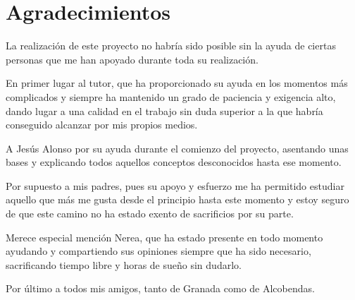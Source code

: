 \chapter*{Agradecimientos}

La realización de este proyecto no habría sido posible sin la ayuda de ciertas personas que me han apoyado durante toda su realización.

En primer lugar al tutor, que ha proporcionado su ayuda en los momentos más complicados y siempre ha mantenido un grado de paciencia y exigencia alto, dando lugar a una calidad en el trabajo sin duda superior a la que habría conseguido alcanzar por mis propios medios.

A Jesús Alonso por su ayuda durante el comienzo del proyecto, asentando unas bases y explicando todos aquellos conceptos desconocidos hasta ese momento.

Por supuesto a mis padres, pues su apoyo y esfuerzo me ha permitido estudiar aquello que más me gusta desde el principio hasta este momento y estoy seguro de que este camino no ha estado exento de sacrificios por su parte.

Merece especial mención Nerea, que ha estado presente en todo momento ayudando y compartiendo sus opiniones siempre que ha sido necesario, sacrificando tiempo libre y horas de sueño sin dudarlo.

Por último a todos mis amigos, tanto de Granada como de Alcobendas.